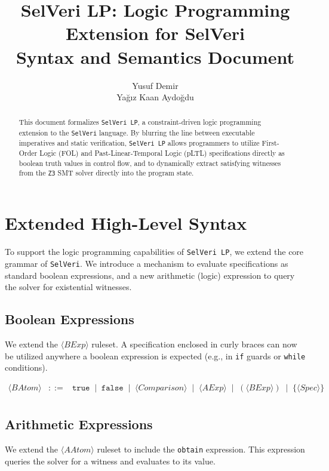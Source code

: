 \documentclass{article}
\title{SelVeri LP: Logic Programming Extension for SelVeri \\ Syntax and Semantics Document}
\author{Yusuf Demir \\ Yağız Kaan Aydoğdu}
\begin{document}
\maketitle

\begin{abstract}
This document formalizes \texttt{SelVeri LP}, a constraint-driven logic programming extension to the \texttt{SelVeri} language. By blurring the line between executable imperatives and static verification, \texttt{SelVeri LP} allows programmers to utilize First-Order Logic (FOL) and Past-Linear-Temporal Logic (pLTL) specifications directly as boolean truth values in control flow, and to dynamically extract satisfying witnesses from the \texttt{Z3} SMT solver directly into the program state.
\end{abstract}

\newpage
\section{Extended High-Level Syntax}

To support the logic programming capabilities of \texttt{SelVeri LP}, we extend the core grammar of \texttt{SelVeri}. We introduce a mechanism to evaluate specifications as standard boolean expressions, and a new arithmetic (logic) expression to query the solver for existential witnesses.

\subsection{Boolean Expressions}
We extend the $\langle \mathit{BExp} \rangle$ ruleset. A specification enclosed in curly braces can now be utilized anywhere a boolean expression is expected (e.g., in \texttt{if} guards or \texttt{while} conditions).

\[
\begin{array}{rcl}
\langle \mathit{BAtom} \rangle
&::=&
\mathtt{true}
\;\mid\;
\mathtt{false}
\;\mid\;
\langle \mathit{Comparison} \rangle
\;\mid\;
\langle \mathit{AExp} \rangle 
\;\mid\;
(\langle \mathit{BExp} \rangle)
\;\mid\;
\textbf{\{} \langle \mathit{Spec} \rangle \textbf{\}} \\[4pt]
\end{array}
\]

\subsection{Arithmetic Expressions}
We extend the $\langle \mathit{AAtom} \rangle$ ruleset to include the \texttt{obtain} expression. This expression queries the solver for a witness and evaluates to its value.
\end{document}
